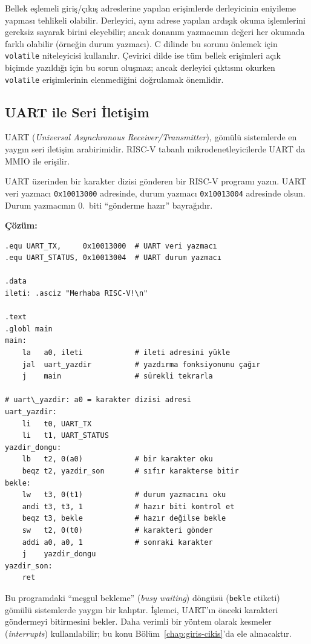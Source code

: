 \begin{bilginot}
Bellek eşlemeli giriş/çıkış adreslerine yapılan erişimlerde derleyicinin eniyileme yapması tehlikeli olabilir. Derleyici, aynı adrese yapılan ardışık okuma işlemlerini gereksiz sayarak birini eleyebilir; ancak donanım yazmacının değeri her okumada farklı olabilir (örneğin durum yazmacı). C dilinde bu sorunu önlemek için \texttt{volatile} niteleyicisi kullanılır. Çevirici dilde ise tüm bellek erişimleri açık biçimde yazıldığı için bu sorun oluşmaz; ancak derleyici çıktısını okurken \texttt{volatile} erişimlerinin elenmediğini doğrulamak önemlidir.
\end{bilginot}

\subsection{UART ile Seri İletişim}
\label{subsec:uart}

UART (\emph{Universal Asynchronous Receiver/Transmitter}), gömülü sistemlerde en yaygın seri iletişim arabirimidir. RISC-V tabanlı mikrodenetleyicilerde UART da MMIO ile erişilir.

\begin{ornek}[4.19]
\label{orn:uart}
UART üzerinden bir karakter dizisi gönderen bir RISC-V programı yazın. UART veri yazmacı \texttt{0x10013000} adresinde, durum yazmacı \texttt{0x10013004} adresinde olsun. Durum yazmacının 0.\ biti ``gönderme hazır'' bayrağıdır.

\textbf{Çözüm:}

\begin{lstlisting}[style=riscv]
.equ UART_TX,     0x10013000  # UART veri yazmacı
.equ UART_STATUS, 0x10013004  # UART durum yazmacı

.data
ileti: .asciz "Merhaba RISC-V!\n"

.text
.globl main
main:
    la   a0, ileti            # ileti adresini yükle
    jal  uart_yazdir          # yazdırma fonksiyonunu çağır
    j    main                 # sürekli tekrarla

# uart\_yazdir: a0 = karakter dizisi adresi
uart_yazdir:
    li   t0, UART_TX
    li   t1, UART_STATUS
yazdir_dongu:
    lb   t2, 0(a0)            # bir karakter oku
    beqz t2, yazdir_son       # sıfır karakterse bitir
bekle:
    lw   t3, 0(t1)            # durum yazmacını oku
    andi t3, t3, 1            # hazır biti kontrol et
    beqz t3, bekle            # hazır değilse bekle
    sw   t2, 0(t0)            # karakteri gönder
    addi a0, a0, 1            # sonraki karakter
    j    yazdir_dongu
yazdir_son:
    ret
\end{lstlisting}

Bu programdaki ``meşgul bekleme'' (\emph{busy waiting}) döngüsü (\texttt{bekle} etiketi) gömülü sistemlerde yaygın bir kalıptır. İşlemci, UART'ın önceki karakteri göndermeyi bitirmesini bekler. Daha verimli bir yöntem olarak kesmeler (\emph{interrupts}) kullanılabilir; bu konu Bölüm~\ref{chap:giris-cikis}'da ele alınacaktır.
\end{ornek}


